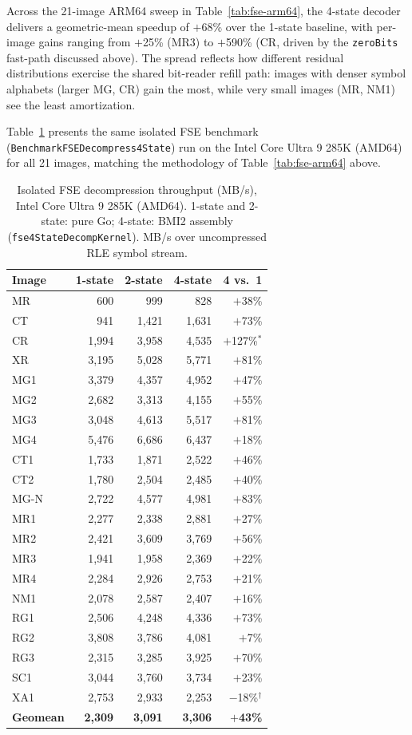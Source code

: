 \documentclass[journal]{IEEEtran}
\begin{document}
Across the 21-image ARM64 sweep in Table~\ref{tab:fse-arm64}, the 4-state
decoder delivers a geometric-mean speedup of $+$68\% over the 1-state
baseline, with per-image gains ranging from $+$25\% (MR3) to $+$590\% (CR,
driven by the \texttt{zeroBits} fast-path discussed above). The spread
reflects how different residual distributions exercise the shared bit-reader
refill path: images with denser symbol alphabets (larger MG, CR) gain the
most, while very small images (MR, NM1) see the least amortization.

Table~\ref{tab:fse-amd64} presents the same isolated FSE benchmark
(\texttt{BenchmarkFSEDecompress4State}) run on the Intel Core Ultra 9
285K (AMD64) for all 21 images, matching the methodology of
Table~\ref{tab:fse-arm64} above.

\begin{table}[tbp]
\centering
\caption{Isolated FSE decompression throughput (MB/s), Intel Core Ultra 9
285K (AMD64). 1-state and 2-state: pure Go; 4-state: BMI2 assembly
(\texttt{fse4StateDecompKernel}). MB/s over uncompressed RLE symbol stream.}
\label{tab:fse-amd64}
\scriptsize
\begin{tabular}{lrrrr}
\toprule
Image & 1-state & 2-state & 4-state & 4 vs.\ 1 \\
\midrule
MR   &   600 &   999 &   828 & $+$38\% \\
CT   &   941 & 1,421 & 1,631 & $+$73\% \\
CR   & 1,994 & 3,958 & 4,535 & $+$127\%$^*$ \\
XR   & 3,195 & 5,028 & 5,771 & $+$81\% \\
MG1  & 3,379 & 4,357 & 4,952 & $+$47\% \\
MG2  & 2,682 & 3,313 & 4,155 & $+$55\% \\
MG3  & 3,048 & 4,613 & 5,517 & $+$81\% \\
MG4  & 5,476 & 6,686 & 6,437 & $+$18\% \\
CT1  & 1,733 & 1,871 & 2,522 & $+$46\% \\
CT2  & 1,780 & 2,504 & 2,485 & $+$40\% \\
MG-N & 2,722 & 4,577 & 4,981 & $+$83\% \\
MR1  & 2,277 & 2,338 & 2,881 & $+$27\% \\
MR2  & 2,421 & 3,609 & 3,769 & $+$56\% \\
MR3  & 1,941 & 1,958 & 2,369 & $+$22\% \\
MR4  & 2,284 & 2,926 & 2,753 & $+$21\% \\
NM1  & 2,078 & 2,587 & 2,407 & $+$16\% \\
RG1  & 2,506 & 4,248 & 4,336 & $+$73\% \\
RG2  & 3,808 & 3,786 & 4,081 & $+$7\% \\
RG3  & 2,315 & 3,285 & 3,925 & $+$70\% \\
SC1  & 3,044 & 3,760 & 3,734 & $+$23\% \\
XA1  & 2,753 & 2,933 & 2,253 & $-$18\%$^\dagger$ \\
\midrule
\textbf{Geomean} & \textbf{2,309} & \textbf{3,091} & \textbf{3,306} & \textbf{$+$43\%} \\
\bottomrule
\end{tabular}
\end{table}
\end{document}
